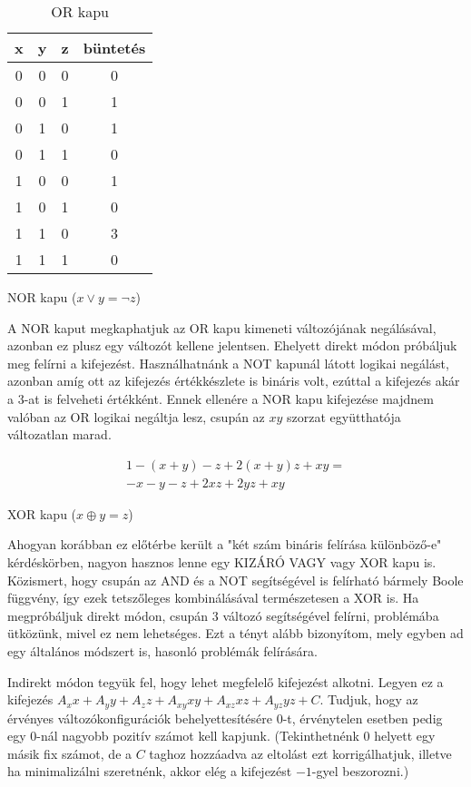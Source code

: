 \begin{table}[ht]
	\footnotesize
	\centering
	\begin{tabular}{ c c c c }
		\toprule
		x & y & z & büntetés \\
		\midrule
		0 & 0 & 0 & 0 \\
		0 & 0 & 1 & 1 \\
		0 & 1 & 0 & 1 \\
		0 & 1 & 1 & 0 \\
		1 & 0 & 0 & 1 \\
		1 & 0 & 1 & 0 \\
		1 & 1 & 0 & 3 \\
		1 & 1 & 1 & 0 \\		
		\bottomrule
	\end{tabular}
	\caption{OR kapu}
	\label{tab:ORgate}
\end{table}

NOR kapu ($x \vee y = \neg z$)

A NOR kaput megkaphatjuk az OR kapu kimeneti változójának negálásával, azonban ez plusz egy változót kellene jelentsen. Ehelyett direkt módon próbáljuk meg felírni a kifejezést. Használhatnánk a NOT kapunál látott logikai negálást, azonban amíg ott az kifejezés értékkészlete is bináris volt, ezúttal a kifejezés akár a $3$-at is felveheti értékként. Ennek ellenére a NOR kapu kifejezése majdnem valóban az OR logikai negáltja lesz, csupán az $xy$ szorzat együtthatója változatlan marad.


\begin{align}
	1-(x+y)-z+2(x+y)z+xy = \\
	 -x-y-z+2xz+2yz+xy
\end{align}

XOR kapu ($x \oplus y = z$)

Ahogyan korábban ez előtérbe került a "két szám bináris felírása különböző-e" kérdéskörben, nagyon hasznos lenne egy KIZÁRÓ VAGY vagy XOR kapu is. Közismert, hogy csupán az AND és a NOT segítségével is felírható bármely Boole függvény, így ezek tetszőleges kombinálásával természetesen a XOR is.
Ha megpróbáljuk direkt módon, csupán 3 változó segítségével felírni, problémába ütközünk, mivel ez nem lehetséges. Ezt a tényt alább bizonyítom, mely egyben ad egy általános módszert is, hasonló problémák felírására.

Indirekt módon tegyük fel, hogy lehet megfelelő kifejezést alkotni. Legyen ez a kifejezés $A_xx+A_yy+A_zz+A_{xy}xy+A_{xz}xz+A_{yz}yz+C$. Tudjuk, hogy az érvényes változókonfigurációk behelyettesítésére $0$-t, érvénytelen esetben pedig egy $0$-nál nagyobb pozitív számot kell kapjunk. 
(Tekinthetnénk $0$ helyett egy másik fix számot, de a $C$ taghoz hozzáadva az eltolást ezt korrigálhatjuk, illetve ha minimalizálni szeretnénk, akkor elég a kifejezést $-1$-gyel beszorozni.)

